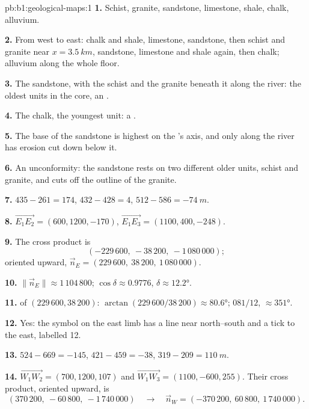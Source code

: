 \begin{solution}{pb:b1:geological-maps:1}
\textbf{1.} Schist, granite, sandstone, limestone, shale, chalk, alluvium.

\textbf{2.} From west to east: chalk and shale, limestone, sandstone, then
schist and granite near $x = \qty{3.5}{km}$, sandstone, limestone and shale
again, then chalk; alluvium along the whole floor.

\textbf{3.} The sandstone, with the schist and the granite beneath it along
the river: the oldest units in the core, an .

\textbf{4.} The chalk, the youngest unit: a .

\textbf{5.} The base of the sandstone is highest on the 's axis,
and only along the river has erosion cut down below it.

\textbf{6.} An unconformity: the sandstone rests on two different older
units, schist and granite, and cuts off the outline of the granite.

\textbf{7.} $435 - 261 = 174$, $432 - 428 = 4$, $512 - 586 = \qty{-74}{m}$.

\textbf{8.} $\overrightarrow{E_1E_2} = (600, 1200, -170)$,
$\overrightarrow{E_1E_3} = (1100, 400, -248)$.

\textbf{9.} The cross product is
\[
  (-229\,600,\ -38\,200,\ -1\,080\,000);
\]
oriented upward, $\vec n_E = (229\,600,\ 38\,200,\ 1\,080\,000)$.

\textbf{10.} $\|\vec n_E\| \approx 1\,104\,800$; $\cos\delta \approx 0.9776$,
$\delta \approx \ang{12.2}$.

\textbf{11.}  of $(229\,600, 38\,200)$: $\arctan(229\,600/38\,200)
\approx \ang{80.6}$;  $081/12$,  $\approx \ang{351}$.

\textbf{12.} Yes: the symbol on the east limb has a  line near
north--south and a  tick to the east, labelled 12.

\textbf{13.} $524 - 669 = -145$, $421 - 459 = -38$, $319 - 209 =
\qty{110}{m}$.

\textbf{14.} $\overrightarrow{W_1W_2} = (700, 1200, 107)$ and
$\overrightarrow{W_1W_3} = (1100, -600, 255)$. Their cross product,
oriented upward, is
\[
  (370\,200,\ -60\,800,\ -1\,740\,000) \quad\longrightarrow\quad
  \vec n_W = (-370\,200,\ 60\,800,\ 1\,740\,000).
\]


\end{solution}
